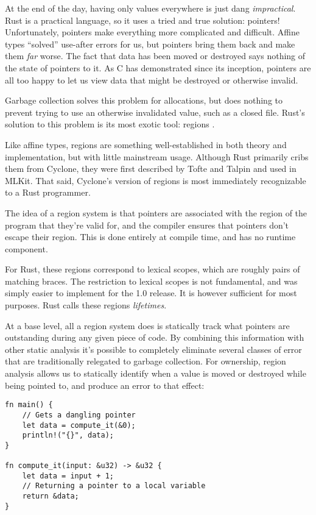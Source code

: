 At the end of the day, having only values everywhere is just dang \emph{impractical}.
Rust is a practical language, so it uses a tried and true solution: pointers! Unfortunately,
pointers make everything more complicated and difficult. Affine types ``solved''
use-after errors for us, but pointers bring them back and make them \emph{far} worse.
The fact that data has been moved or destroyed says nothing of the state of
pointers to it. As C has demonstrated since its inception, pointers are all too
happy to let us view data that might be destroyed or otherwise invalid.

Garbage collection solves this problem for allocations, but does nothing to
prevent trying to use an otherwise invalidated value, such as a closed file.
Rust's solution to this problem is its most exotic tool: regions \cite{swamy2006safe}.

Like affine types, regions are something well-established in both theory and
implementation, but with little mainstream usage. Although Rust primarily cribs
them from Cyclone, they were first described by Tofte and Talpin \cite{tofte1997region}
and used in MLKit. That said, Cyclone's version of regions
is most immediately recognizable to a Rust programmer.

The idea of a region system is that pointers are associated with the region of
the program that they're valid for, and the compiler ensures that pointers don't
escape their region. This is done entirely at compile time, and has no runtime
component.

For Rust, these regions correspond to lexical scopes, which are roughly
pairs of matching braces. The restriction to lexical scopes is not fundamental,
and was simply easier to implement for the 1.0 release. It is however sufficient
for most purposes. Rust calls these regions \emph{lifetimes}.

At a base level, all a region system does is statically track what pointers are
outstanding during any given piece of code. By combining this information with
other static analysis it's possible to completely eliminate several classes of error
that are traditionally relegated to garbage collection. For ownership, region analysis allows us
to statically identify when a value is moved or destroyed while being pointed to,
and produce an error to that effect:

\begin{verbatim}
fn main() {
    // Gets a dangling pointer
    let data = compute_it(&0);
    println!("{}", data);
}

fn compute_it(input: &u32) -> &u32 {
    let data = input + 1;
    // Returning a pointer to a local variable
    return &data;
}
\end{verbatim}

